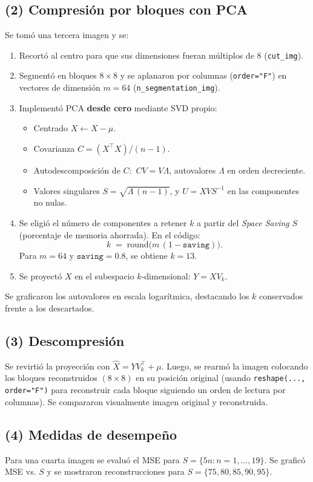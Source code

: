 \documentclass[12pt]{article}
\begin{document}
\subsection*{(2) Compresión por bloques con PCA}
Se tomó una tercera imagen y se:
\begin{enumerate}
  \item Recortó al centro para que sus dimensiones fueran múltiplos de \(8\) (\texttt{cut\_img}).
  \item Segmentó en bloques \(8\times 8\) y se aplanaron por columnas (\texttt{order="F"}) en vectores de dimensión \(m=64\) (\texttt{n\_segmentation\_img}).
  \item Implementó PCA \textbf{desde cero} mediante SVD propio:
  \begin{itemize}
    \item Centrado \(X \leftarrow X-\mu\).
    \item Covarianza \(C=(X^\top X)/(n-1)\).
    \item Autodescomposición de \(C\): \(\,C V = V \Lambda\), autovalores \(\Lambda\) en orden decreciente.
    \item Valores singulares \(S=\sqrt{\Lambda\,(n-1)}\), y \(U = X V S^{-1}\) en las componentes no nulas.
  \end{itemize}
  \item Se eligió el número de componentes a retener \(k\) a partir del \emph{Space Saving} \(S\) (porcentaje de memoria ahorrada). En el código:
  \[
    k \;=\; \mathrm{round}\big(m\,(1-\texttt{saving})\big).
  \]
  Para \(m=64\) y \(\texttt{saving}=0.8\), se obtiene \(k=13\).
  \item Se proyectó \(X\) en el subespacio \(k\)-dimensional: \(Y = X V_k\).
\end{enumerate}
Se graficaron los autovalores en escala logarítmica, destacando los \(k\) conservados frente a los descartados.

\subsection*{(3) Descompresión}
Se revirtió la proyección con \( \widehat{X} = Y V_k^\top + \mu \). Luego, se rearmó la imagen colocando los bloques reconstruidos \((8\times 8)\) en su posición original (usando \texttt{reshape(..., order="F")} para reconstruir cada bloque siguiendo un orden de lectura por columnas). Se compararon visualmente imagen original y reconstruida.

\subsection*{(4) Medidas de desempeño}
Para una cuarta imagen se evaluó el MSE para \(S=\{5n: n=1,\dots,19\}\). Se graficó MSE vs. \(S\) y se mostraron reconstrucciones para \(S=\{75,80,85,90,95\}\).
\end{document}
